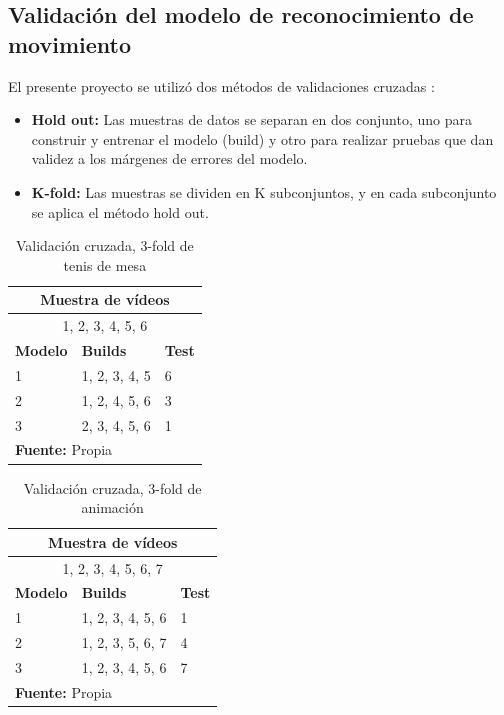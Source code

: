 \subsection{Validaci\'on del modelo de reconocimiento de movimiento}\label{dis:validate}
El presente proyecto se utiliz\'o dos m\'etodos de validaciones cruzadas \cite{perez2015analisis}:
\begin{itemize}
\item \textbf{Hold out:} Las muestras de datos se separan en dos conjunto, uno para construir y entrenar el modelo (build) y otro para realizar pruebas que dan validez a los m\'argenes  de errores del modelo.
\item \textbf{K-fold:} Las muestras se dividen en K subconjuntos, y en cada subconjunto se aplica el m\'etodo hold out.
\end{itemize}  
\begin{table}[H]
\begin{center}
\caption{Validaci\'on cruzada, 3-fold de tenis de mesa}
\label{tab:KfoldTenis}
\begin{tabular}{|l|l|l|}
\hline
\multicolumn{3}{|c|}{\textbf{Muestra de v\'ideos}} \\ \hline
\multicolumn{3}{|c|}{1, 2, 3, 4, 5, 6} \\ \hline
\textbf{Modelo} & \textbf{Builds} & \textbf{Test} \\ \hline
1 & 1, 2, 3, 4, 5 & 6 \\ \hline
2 & 1, 2, 4, 5, 6 & 3 \\ \hline
3 & 2, 3, 4, 5, 6 & 1 \\ \hline
\multicolumn{3}{l}{\textbf{Fuente:} Propia}
\end{tabular}
\end{center}
\end{table}
\begin{table}[H]
\begin{center}
\caption{Validaci\'on cruzada, 3-fold de animaci\'on}
\label{tab:KfoldAnimacion}
\begin{tabular}{|l|l|l|}
\hline
\multicolumn{3}{|c|}{\textbf{Muestra de v\'ideos}} \\ \hline
\multicolumn{3}{|c|}{1, 2, 3, 4, 5, 6, 7} \\ \hline
\textbf{Modelo} & \textbf{Builds} & \textbf{Test} \\ \hline
1 & 1, 2, 3, 4, 5, 6 & 1 \\ \hline
2 & 1, 2, 3, 5, 6, 7 & 4 \\ \hline
3 & 1, 2, 3, 4, 5, 6 & 7 \\ \hline
\multicolumn{3}{l}{\textbf{Fuente:} Propia}
\end{tabular}
\end{center}
\end{table}
